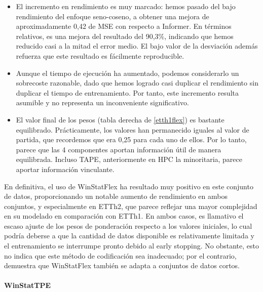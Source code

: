  
 \begin{itemize}
 	\item El incremento en rendimiento es muy marcado: hemos pasado del bajo rendimiento del enfoque seno-coseno, a obtener una mejora de aproximadamente 0,42 de MSE con respecto a Informer. En términos relativos, es una mejora del resultado del 90,3\%, indicando que hemos reducido casi a la mitad el error medio. El bajo valor de la desviación además refuerza que este resultado es fácilmente reproducible.
 	
 	\item Aunque el tiempo de ejecución ha aumentado, podemos considerarlo un sobrecoste razonable, dado que hemos logrado casi duplicar el rendimiento sin duplicar el tiempo de entrenamiento. Por tanto, este incremento resulta asumible y no representa un inconveniente significativo.
 	
 	\item El valor final de los pesos (tabla derecha de \ref{etth1flex}) es bastante equilibrado. Prácticamente, los valores han permanecido iguales al valor de partida, que recordemos que era 0,25 para cada uno de ellos. Por lo tanto, parece que las 4 componentes aportan información útil de manera equilibrada. Incluso TAPE, anteriormente en HPC la minoritaria, parece aportar información vinculante.
 \end{itemize}
 
 En definitiva, el uso de WinStatFlex ha resultado muy positivo en este conjunto de datos, proporcionando un notable aumento de rendimiento en ambos conjuntos, y especialmente en ETTh2, que parece reflejar una mayor complejidad en su modelado en comparación con ETTh1. En ambos casos, es llamativo el escaso ajuste de los pesos de ponderación respecto a los valores iniciales, lo cual podría deberse a que la cantidad de datos disponible es relativamente limitada y el entrenamiento se interrumpe pronto debido al early stopping. No obstante, esto no indica que este método de codificación sea inadecuado; por el contrario, demuestra que WinStatFlex también se adapta a conjuntos de datos cortos.
 
 \paragraph{WinStatTPE}
 
